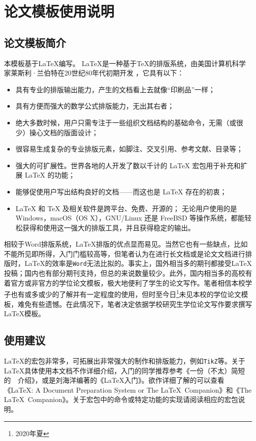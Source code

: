 \chapter{论文模板使用说明}
\graphicspath{{figures/chap02/}}
\section{论文模板简介}
本模板基于\LaTeX{}编写。 \LaTeX{}是一种基于\TeX{}的排版系统，由美国计算机科学家莱斯利·兰伯特在20世纪80年代初期开发 \cite{维基百科2020}，它具有以下\cite{CTEX开发小组2020}：

\begin{itemize}
    \item 具有专业的排版输出能力，产生的文档看上去就像“印刷品”一样；
    \item 具有方便而强大的数学公式排版能力，无出其右者；
    \item 绝大多数时候，用户只需专注于一些组织文档结构的基础命令，无需（或很少）操心文档的版面设计；
    \item 很容易生成复杂的专业排版元素，如脚注、交叉引用、参考文献、目录等；
    \item 强大的可扩展性。世界各地的人开发了数以千计的 \LaTeX{} 宏包用于补充和扩展 \LaTeX{} 的功能；
    \item 能够促使用户写出结构良好的文档——而这也是 \LaTeX{} 存在的初衷；
    \item \LaTeX{} 和 \TeX{} 及相关软件是跨平台、免费、开源的；
    无论用户使用的是 Windows，macOS（OS X），GNU/Linux 还是 FreeBSD 等操作系统，都能轻松获得和使用这一强大的排版工具，并且获得稳定的输出。
  \end{itemize}

相较于Word排版系统，\LaTeX{}排版的优点显而易见。当然它也有一些缺点，比如不能所见即所得，入门门槛较高等，但笔者认为在进行长文档或是论文文档进行排版时，\LaTeX{}的效率是\texttt{Word}无法比拟的。事实上，国外相当多的期刊都接受\LaTeX{}投稿；国内也有部分期刊支持，但总的来说数量较少。此外，国内相当多的高校有着官方或非官方的学位论文模板，极大地便利了学生的论文写作。笔者相信本校学子也有或多或少的了解并有一定程度的使用，但时至今日\footnote{2020年夏}未见本校的学位论文模板，难免有些遗憾。在此情况下，笔者决定依据学校研究生学位论文写作要求撰写\LaTeX{}模板。

\section{使用建议}
\LaTeX{}的宏包非常多，可拓展出非常强大的制作和排版能力，例如\texttt{TikZ}等。关于\LaTeX{}具体使用本文档不作详细介绍，入门的同学推荐参考《一份（不太）简短的~\LaTeXe{}~介绍》\cite{CTEX开发小组2020}，或是刘海洋编著的《\LaTeX{}入门》\cite{刘海洋2013}。欲作详细了解的可以查看《\LaTeX{}: A Document Preparation System or The \LaTeX{}~Companion》\cite{Lamport1994}和《The \LaTeX{}~Companion》\cite{Mittelbach2004}。关于宏包中的命令或特定功能的实现请阅读相应的宏包说明。

